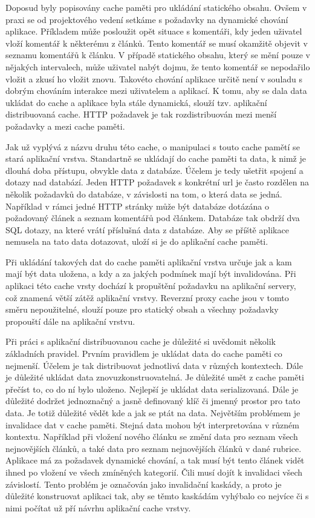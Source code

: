 \documentclass[12pt]{article}
\begin{document}
Doposud byly popisovány cache paměti pro ukládání statického obsahu. Ovšem v praxi se od projektového vedení setkáme s požadavky na dynamické chování aplikace. Příkladem může posloužit opět situace s komentáři, kdy jeden uživatel vloží komentář k některému z článků. Tento komentář se musí okamžitě objevit v seznamu komentářů k článku. V případě statického obsahu, který se mění pouze v nějakých intervalech, může uživatel nabýt dojmu, že tento komentář se nepodařilo vložit a zkusí ho vložit znovu. Takovéto chování aplikace určitě není v souladu s dobrým chováním interakce mezi uživatelem a aplikací. K tomu, aby se dala data ukládat do cache a aplikace byla stále dynamická, slouží tzv. aplikační distribuovaná cache. HTTP požadavek je tak rozdistribuován mezi menší požadavky a mezi cache paměti.

Jak už vyplývá z názvu druhu této cache, o manipulaci s touto cache pamětí se stará aplikační vrstva. Standartně se ukládají do cache paměti ta data, k nimž je dlouhá doba přístupu, obvykle data z databáze. Účelem je tedy ušetřit spojení a dotazy nad databází. Jeden HTTP požadavek s konkrétní url je často rozdělen na několik požadavků do databáze, v závislosti na tom, o která data se jedná. Například v rámci jedné HTTP stránky může být databáze dotázána o požadovaný článek a seznam komentářů pod článkem. Databáze tak obdrží dva SQL dotazy, na které vrátí příslušná data z databáze. Aby se příště aplikace nemusela na tato data dotazovat, uloží si je do aplikační cache paměti.

Při ukládání takových dat do cache paměti aplikační vrstva určuje jak a kam mají být data uložena, a kdy a za jakých podmínek mají být invalidována. Při aplikaci této cache vrsty dochází k propuštění požadavku na aplikační servery, což znamená větší zátěž aplikační vrstvy. Reverzní proxy cache jsou v tomto směru nepoužitelné, slouží pouze pro statický obsah a všechny požadavky propouští dále na aplikační vrstvu.

Při práci s aplikační distribuovanou cache je důležité si uvědomit několik základních pravidel. Prvním pravidlem je ukládat data do cache paměti co nejmenší. Účelem je tak distribuovat jednotlivá data v různých kontextech. Dále je důležité ukládat data znovuzkonstruovatelná. Je důležité umět z cache paměti přečíst to, co do ní bylo uloženo. Nejlepší je ukládat data serializovaná. Dále je důležité dodržet jednoznačný a jasně definovaný klíč či jmenný prostor pro tato data. Je totiž důležité vědět kde a jak se ptát na data. Největším problémem je invalidace dat v cache paměti. Stejná data mohou být interpretována v různém kontextu. Například při vložení nového článku se změní data pro seznam všech nejnovějších článků, a také data pro seznam nejnovějších článků v dané rubrice. Aplikace má za požadavek dynamické chování, a tak musí být tento článek vidět ihned po vložení ve všech zmíněných kategorií. Čili musí dojít k invalidaci všech závislostí. Tento problém je označován jako invalidační kaskády, a proto je důležité konstruovat aplikaci tak, aby se těmto kaskádám vyhýbalo co nejvíce či s nimi počítat už pří návrhu aplikační cache vrstvy.
\end{document}
